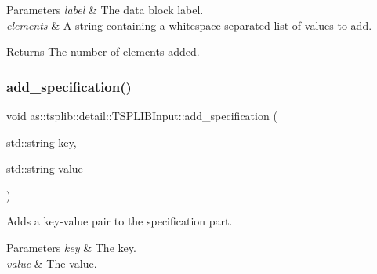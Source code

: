 \begin{DoxyParams}{Parameters}
{\em label} & The data block label. \\
\hline
{\em elements} & A string containing a whitespace-\/separated list of values to add. \\
\hline
\end{DoxyParams}
\begin{DoxyReturn}{Returns}
The number of elements added. 
\end{DoxyReturn}
\mbox{\label{classas_1_1tsplib_1_1detail_1_1TSPLIBInput_a169a52e7d6767159e3dd0b5e039e8087}} 
\subsubsection{\texorpdfstring{add\+\_\+specification()}{add\_specification()}}
{\footnotesize\ttfamily void as\+::tsplib\+::detail\+::\+T\+S\+P\+L\+I\+B\+Input\+::add\+\_\+specification (\begin{DoxyParamCaption}\item[{std\+::string}]{key,  }\item[{std\+::string}]{value }\end{DoxyParamCaption})\hspace{0.3cm}{\ttfamily [inline]}}



Adds a key-\/value pair to the specification part. 


\begin{DoxyParams}{Parameters}
{\em key} & The key. \\
\hline
{\em value} & The value. \\
\hline
\end{DoxyParams}
\mbox{\label{classas_1_1tsplib_1_1detail_1_1TSPLIBInput_ac91a185552ff34931a9a37862e03356a}} 
